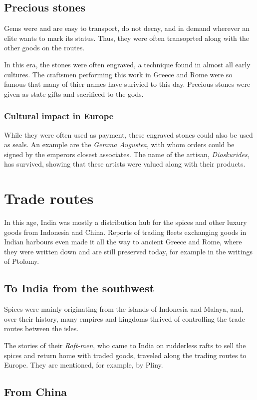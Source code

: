 \documentclass[11pt, a4paper]{scrreprt}
\begin{document}
\subsection{Precious stones}
Gems were and are easy to transport, do not decay, and in demand wherever an elite wants to mark its status. Thus, they were often transoprted along with the other goods on the routes.

In this era, the stones were often engraved, a technique found in almost all early cultures. The craftsmen performing this work in Greece and Rome were so famous that many of thier names have surivied to this day. Precious stones were given as state gifts and sacrificed to the gods.

\subsubsection{Cultural impact in Europe}

While they were often used as payment, these engraved stones could also be used as seals. An example are the \emph{Gemma Augustea}, with whom orders could be signed by the emperors closest associates. The name of the artisan, \emph{Dioskurides}, has survived, showing that these artists were valued along with their products.
\section{Trade routes}
In this age, India was mostly a distribution hub for the spices and other luxury goods from Indonesia and China. Reports of trading fleets exchanging goods in Indian harbours even made it all the way to ancient Greece and Rome, where they were written down and are still preserved today, for example in the writings of Ptolomy.

\subsection{To India from the southwest}

Spices were mainly originating from the islands of Indonesia and Malaya, and, over their history, many empires and kingdoms thrived of controlling the trade routes between the isles.

The stories of their \emph{Raft-men}, who came to India on rudderless rafts to sell the spices and return home with traded goods, traveled along the trading routes to Europe. They are mentioned, for example, by Pliny.

\subsection{From China}
\end{document}
